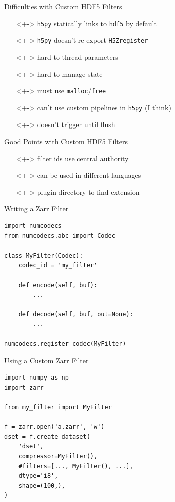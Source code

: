 \documentclass{beamer}
\begin{document}
\begin{frame}{Difficulties with Custom HDF5 Filters}
  \begin{itemize}
  \item[]<+-> \texttt{h5py} statically links to \texttt{hdf5} by default
  \item[]<+-> \texttt{h5py} doesn't re-export \texttt{H5Zregister}
  \item[]<+-> hard to thread parameters
  \item[]<+-> hard to manage state
  \item[]<+-> must use \texttt{malloc}/\texttt{free}
  \item[]<+-> can't use custom pipelines in \texttt{h5py} (I think)
  \item[]<+-> doesn't trigger until flush
  \end{itemize}
\end{frame}

\begin{frame}{Good Points with Custom HDF5 Filters}
  \begin{itemize}
  \item[]<+-> filter ids use central authority
  \item[]<+-> can be used in different languages
  \item[]<+-> plugin directory to find extension
  \end{itemize}
\end{frame}

\begin{frame}[fragile]{Writing a Zarr Filter}
  \begin{verbatim}
import numcodecs
from numcodecs.abc import Codec

class MyFilter(Codec):
    codec_id = 'my_filter'

    def encode(self, buf):
        ...

    def decode(self, buf, out=None):
        ...

numcodecs.register_codec(MyFilter)
  \end{verbatim}
\end{frame}

\begin{frame}[fragile]{Using a Custom Zarr Filter}
  \begin{verbatim}
import numpy as np
import zarr

from my_filter import MyFilter

f = zarr.open('a.zarr', 'w')
dset = f.create_dataset(
    'dset',
    compressor=MyFilter(),
    #filters=[..., MyFilter(), ...],
    dtype='i8',
    shape=(100,),
)
  \end{verbatim}
\end{frame}
\end{document}
